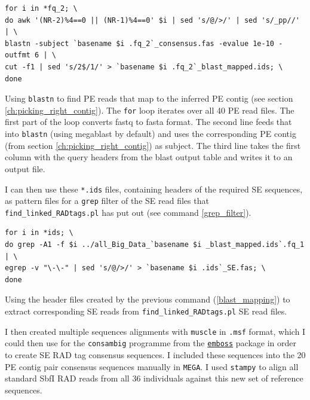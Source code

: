 \documentclass[a4paper,12pt,times,print,index, custombib]{PhDThesisPSnPDF}\usepackage[]{graphicx}\usepackage[]{color}
\begin{document}
\begin{cmd}
\captionsetup{type=cmd}
\begin{Verbatim}[fontsize=\scriptsize, formatcom=\color{darkgray}]
for i in *fq_2; \
do awk '(NR-2)%4==0 || (NR-1)%4==0' $i | sed 's/@/>/' | sed 's/_pp//' | \
blastn -subject `basename $i .fq_2`_consensus.fas -evalue 1e-10 -outfmt 6 | \
cut -f1 | sed 's/2$/1/' > `basename $i .fq_2`_blast_mapped.ids; \
done
\end{Verbatim}
\caption{\small Using \texttt{blastn} to find PE reads that map to the inferred PE contig (see section \vref{ch:picking_right_contig}). The \texttt{for} loop iterates over all 40 PE read files. The first part of the loop converts fastq to fasta format. The second line feeds that into \texttt{blastn} (using megablast by default) and uses the corresponding PE contig (from section \ref{ch:picking_right_contig}) as subject. The third line takes the first column with the query headers from the blast output table and writes it to an output file.
}
\label{blast_mapping} 
\end{cmd}

I can then use these \texttt{*.ids} files, containing headers of the required SE sequences, as pattern files for a \texttt{grep} filter of the SE read files that \texttt{find\_linked\_RADtags.pl} has put out (see command \ref{grep_filter}).

\begin{cmd}
\captionsetup{type=cmd}
\begin{Verbatim}[fontsize=\scriptsize, formatcom=\color{darkgray}]
for i in *ids; \
do grep -A1 -f $i ../all_Big_Data_`basename $i _blast_mapped.ids`.fq_1 | \
egrep -v "\-\-" | sed 's/@/>/' > `basename $i .ids`_SE.fas; \
done
\end{Verbatim}
\caption{\small Using the header files created by the previous command (\ref{blast_mapping}) to extract corresponding SE reads from \texttt{find\_linked\_RADtags.pl} SE read files.}
\label{grep_filter}
\end{cmd}

I then created multiple sequences alignments with \texttt{muscle} in \texttt{.msf} format, which I could then use for the \texttt{consambig} programme from the \href{http://emboss.sourceforge.net/apps/release/6.6/emboss/apps/consambig.html}{\texttt{emboss}} package in order to create SE \gls{RAD tag} consensus sequences. I included these sequences into the 20 PE contig pair consensus sequences manually in \texttt{MEGA}. I used \texttt{stampy} to align all standard SbfI RAD reads from all 36 individuals against this new set of reference sequences.
\end{document}
